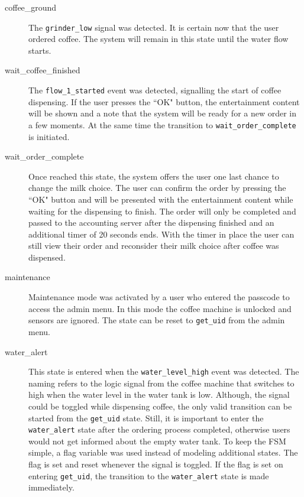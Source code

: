 \documentclass[12pt]{article}
\begin{document}
\begin{description}
  \item [coffee\_ground]
        The \texttt{grinder\_low} signal was detected. It is certain now that the user ordered coffee.
        The system will remain in this state until the water flow starts.

  \item [wait\_coffee\_finished]
        The \texttt{flow\_1\_started} event was detected, signalling the start of coffee dispensing.
        If the user presses the ``OK" button, 
        the entertainment content will be shown and a note that the system will be ready for a new order in a few moments.
        At the same time the transition to \texttt{wait\_order\_complete} is initiated.

  \item [wait\_order\_complete]
        Once reached this state, the system offers the user one last chance to change the milk choice.
        The user can confirm the order by pressing the ``OK" button and will be presented with the entertainment content while waiting for the dispensing to finish.
        The order will only be completed and passed to the accounting server after the dispensing finished and an additional timer of 20 seconds ends.
        With the timer in place the user can still view their order and reconsider their milk choice after coffee was dispensed.

  \item [maintenance]
        Maintenance mode was activated by a user who entered the passcode to access the admin menu.
        In this mode the coffee machine is unlocked and sensors are ignored.
        The state can be reset to \texttt{get\_uid} from the admin menu.

  \item [water\_alert]
        This state is entered when the \texttt{water\_level\_high} event was detected.
        The naming refers to the logic signal from the coffee machine that switches to high when the water level in the water tank is low.
        Although, the signal could be toggled while dispensing coffee,
        the only valid transition can be started from the \texttt{get\_uid} state.
        Still, it is important to enter the \texttt{water\_alert} state after the ordering process completed,
        otherwise users would not get informed about the empty water tank.
        To keep the FSM simple, a flag variable was used instead of modeling additional states.
        The flag is set and reset whenever the signal is toggled.
        If the flag is set on entering \texttt{get\_uid}, the transition to the \texttt{water\_alert} state is made immediately.


\end{description}
\end{document}
